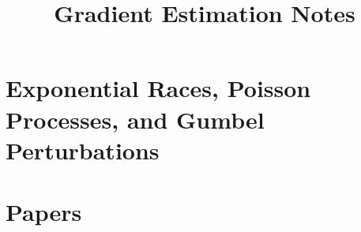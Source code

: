 \documentclass{article}
\title{Gradient Estimation Notes}
\begin{document}
\maketitle
















\newpage
\setcounter{section}{0}
\part*{Exponential Races, Poisson Processes, and Gumbel Perturbations}



\newpage
\setcounter{section}{0}
\part*{Papers}





\newpage


\end{document}
